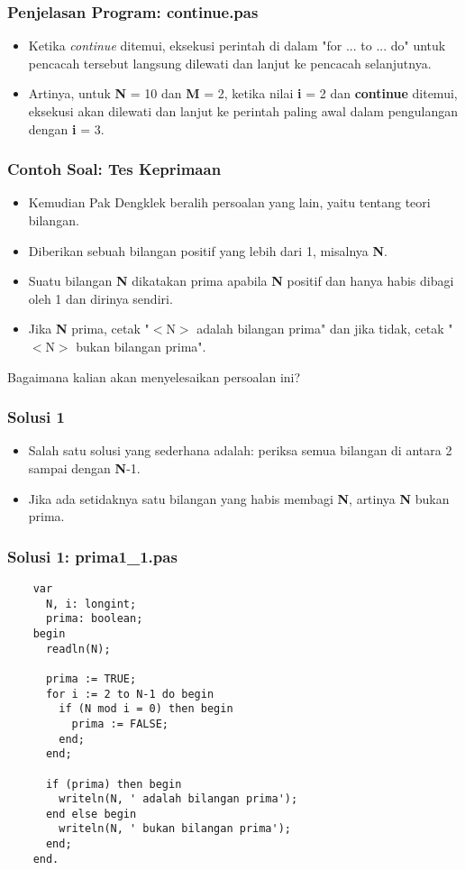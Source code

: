 \begin{frame}
\frametitle{Penjelasan Program: continue.pas}
\begin{itemize}
  \item Ketika \textit{continue} ditemui, eksekusi perintah di dalam "for ... to ... do" untuk pencacah tersebut langsung dilewati dan lanjut ke pencacah selanjutnya.
  \item Artinya, untuk \textbf{N} = 10 dan \textbf{M} = 2, ketika nilai \textbf{i} = 2 dan \textbf{continue} ditemui, eksekusi akan dilewati dan lanjut ke perintah paling awal dalam pengulangan dengan \textbf{i} = 3.
\end{itemize}
\end{frame}


\begin{frame}
\frametitle{Contoh Soal: Tes Keprimaan}
\begin{itemize}
  \item Kemudian Pak Dengklek beralih persoalan yang lain, yaitu tentang teori bilangan.
  \item Diberikan sebuah bilangan positif yang lebih dari 1, misalnya \textbf{N}.
  \item Suatu bilangan \textbf{N} dikatakan prima apabila \textbf{N} positif dan hanya habis dibagi oleh 1 dan dirinya sendiri.
  \item Jika \textbf{N} prima, cetak "$<$N$>$ adalah bilangan prima" dan jika tidak, cetak "$<$N$>$ bukan bilangan prima".
\end{itemize}
Bagaimana kalian akan menyelesaikan persoalan ini?
\end{frame}

\begin{frame}
\frametitle{Solusi 1}
\begin{itemize}
  \item Salah satu solusi yang sederhana adalah: periksa semua bilangan di antara 2 sampai dengan \textbf{N}-1.
  \item Jika ada setidaknya satu bilangan yang habis membagi \textbf{N}, artinya \textbf{N} bukan prima.
\end{itemize}
\end{frame}


\begin{frame}[fragile]
\frametitle{Solusi 1: prima1\_1.pas}
  \begin{lstlisting}
    var
      N, i: longint;
      prima: boolean;
    begin
      readln(N);

      prima := TRUE;
      for i := 2 to N-1 do begin
        if (N mod i = 0) then begin
          prima := FALSE;
        end;
      end;

      if (prima) then begin
        writeln(N, ' adalah bilangan prima');
      end else begin
        writeln(N, ' bukan bilangan prima');
      end;
    end.
  \end{lstlisting}
\end{frame}

